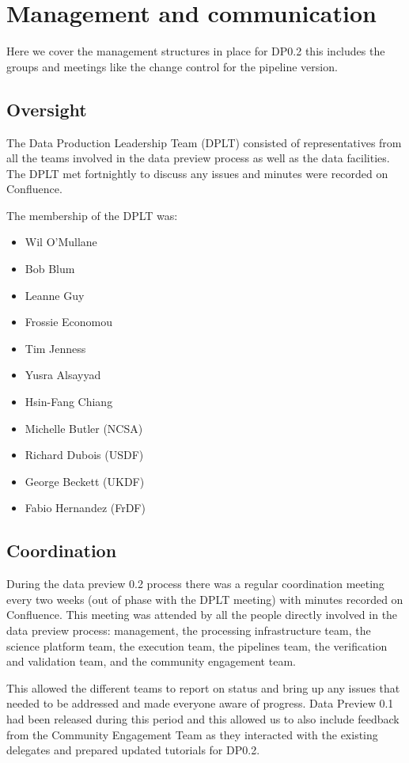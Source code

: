 \section{Management and communication} \label{sec:management}

Here we cover the management structures in place for DP0.2 this includes the groups and meetings like the change control for the pipeline version.

\subsection{Oversight}

The Data Production Leadership Team (DPLT) consisted of representatives from all the teams involved in the data preview process as well as the data facilities.
The DPLT met fortnightly to discuss any issues and minutes were recorded on Confluence.

The membership of the DPLT was:

\begin{itemize}
\item Wil O'Mullane
\item Bob Blum
\item Leanne Guy
\item Frossie Economou
\item Tim Jenness
\item Yusra Alsayyad
\item Hsin-Fang Chiang
\item Michelle Butler (NCSA)
\item Richard Dubois (USDF)
\item George Beckett (UKDF)
\item Fabio Hernandez (FrDF)
\end{itemize}

\subsection{Coordination}

During the data preview 0.2 process there was a regular coordination meeting every two weeks (out of phase with the DPLT meeting) with minutes recorded on Confluence.
This meeting was attended by all the people directly involved in the data preview process: management, the processing infrastructure team, the science platform team, the execution team, the pipelines team, the verification and validation team, and the community engagement team.

This allowed the different teams to report on status and bring up any issues that needed to be addressed and made everyone aware of progress.
Data Preview 0.1 had been released during this period and this allowed us to also include feedback from the Community Engagement Team as they interacted with the existing delegates and prepared updated tutorials for DP0.2.

